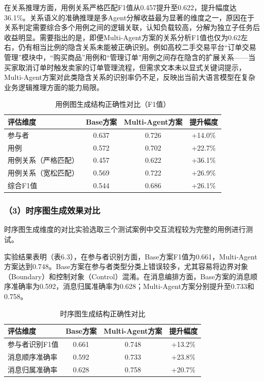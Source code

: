 在关系推理方面，用例关系严格匹配F1值从0.457提升至0.622，提升幅度达36.1\%。关系语义的准确推理是多Agent分解收益最为显著的维度之一，原因在于关系判定需要综合多个用例之间的逻辑关联，认知负载较高，分解为独立子任务后收益明显。需要指出的是，即便Multi-Agent方案的关系分析F1值也仅为0.62左右，仍有相当比例的隐含关系未能被正确识别。例如高校二手交易平台“订单交易管理”模块中，“购买商品”用例和“管理订单”用例之间存在隐含的扩展关系——当买家取消订单时触发卖家的订单管理流程，但需求文本未以显式关键词提示，Multi-Agent方案对此类隐含关系的识别率仍不足，反映出当前大语言模型在复杂业务逻辑推理方面的能力局限。

\begin{table}[htbp]
    \centering
    \caption{用例图生成结构正确性对比（F1值）}
    \label{tab:usecase_comparison}
    \begin{tabular}{lccc}
        \toprule
        评估维度 & Base方案 & Multi-Agent方案 & 提升幅度 \\
        \midrule
        参与者 & 0.637 & 0.726 & +14.0\% \\
        用例 & 0.572 & 0.702 & +22.7\% \\
        用例关系（严格匹配） & 0.457 & 0.622 & +36.1\% \\
        用例关系（宽松匹配） & 0.569 & 0.722 & +26.9\% \\
        综合F1值 & 0.544 & 0.686 & +26.1\% \\
        \bottomrule
    \end{tabular}
\end{table}

\subsubsection{（3）时序图生成效果对比}

时序图生成维度的对比实验选取三个测试案例中交互流程较为完整的用例进行测试。

实验结果表明（表6.3），在参与者识别方面，Base方案F1值为0.661，Multi-Agent方案达到0.748。Base方案在参与者类型分类上错误较多，尤其容易将边界对象（Boundary）和控制对象（Control）混淆。在消息编排方面，Base方案的消息顺序准确率为0.592，消息归属准确率为0.628；Multi-Agent方案分别提升至0.733和0.758。

\begin{table}[htbp]
    \centering
    \caption{时序图生成结构正确性对比}
    \label{tab:sequence_comparison}
    \begin{tabular}{lccc}
        \toprule
        评估维度 & Base方案 & Multi-Agent方案 & 提升幅度 \\
        \midrule
        参与者识别F1值 & 0.661 & 0.748 & +13.2\% \\
        消息顺序准确率 & 0.592 & 0.733 & +23.8\% \\
        消息归属准确率 & 0.628 & 0.758 & +20.7\% \\
        \bottomrule
    \end{tabular}
\end{table}

